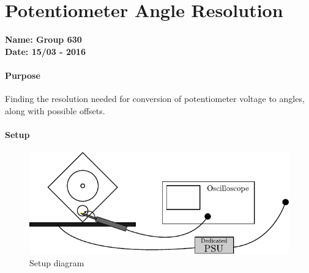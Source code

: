 \chapter{Potentiometer Angle Resolution}\label{app:potentiometerRes} 
\textbf{Name: Group 630}\\
\textbf{Date: 15/03 - 2016}

\subsubsection{Purpose}
Finding the resolution needed for conversion of potentiometer voltage to angles, along with possible offsets.

\subsubsection{Setup}
\begin{figure}[H]
  \centering
	\includegraphics[scale=1]{figures/LabSetupRangeTest.pdf}
	\caption{Setup diagram}
	\label{LabSetupRangeTest2}
\end{figure}\vspace{-5mm}


